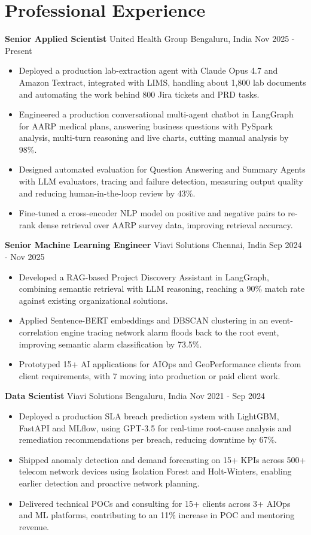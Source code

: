 \documentclass[10pt,a4paper]{article}
\newcommand{\role}[4]{\textbf{#1} \textbar{} #2 \hfill #3 \textbar{} #4\par}
\begin{document}
\section{Professional Experience}
\role{Senior Applied Scientist}{United Health Group}{Bengaluru, India}{Nov 2025 - Present}
\begin{itemize}
  \item Deployed a production lab-extraction agent with Claude Opus 4.7 and Amazon Textract, integrated with LIMS, handling about 1,800 lab documents and automating the work behind 800 Jira tickets and PRD tasks.
  \item Engineered a production conversational multi-agent chatbot in LangGraph for AARP medical plans, answering business questions with PySpark analysis, multi-turn reasoning and live charts, cutting manual analysis by 98\%.
  \item Designed automated evaluation for Question Answering and Summary Agents with LLM evaluators, tracing and failure detection, measuring output quality and reducing human-in-the-loop review by 43\%.
  \item Fine-tuned a cross-encoder NLP model on positive and negative pairs to re-rank dense retrieval over AARP survey data, improving retrieval accuracy.
\end{itemize}
\vspace{3pt}
\role{Senior Machine Learning Engineer}{Viavi Solutions}{Chennai, India}{Sep 2024 - Nov 2025}
\begin{itemize}
  \item Developed a RAG-based Project Discovery Assistant in LangGraph, combining semantic retrieval with LLM reasoning, reaching a 90\% match rate against existing organizational solutions.
  \item Applied Sentence-BERT embeddings and DBSCAN clustering in an event-correlation engine tracing network alarm floods back to the root event, improving semantic alarm classification by 73.5\%.
  \item Prototyped 15+ AI applications for AIOps and GeoPerformance clients from client requirements, with 7 moving into production or paid client work.
\end{itemize}
\vspace{3pt}
\role{Data Scientist}{Viavi Solutions}{Bengaluru, India}{Nov 2021 - Sep 2024}
\begin{itemize}
  \item Deployed a production SLA breach prediction system with LightGBM, FastAPI and MLflow, using GPT-3.5 for real-time root-cause analysis and remediation recommendations per breach, reducing downtime by 67\%.
  \item Shipped anomaly detection and demand forecasting on 15+ KPIs across 500+ telecom network devices using Isolation Forest and Holt-Winters, enabling earlier detection and proactive network planning.
  \item Delivered technical POCs and consulting for 15+ clients across 3+ AIOps and ML platforms, contributing to an 11\% increase in POC and mentoring revenue.
\end{itemize}
\end{document}
